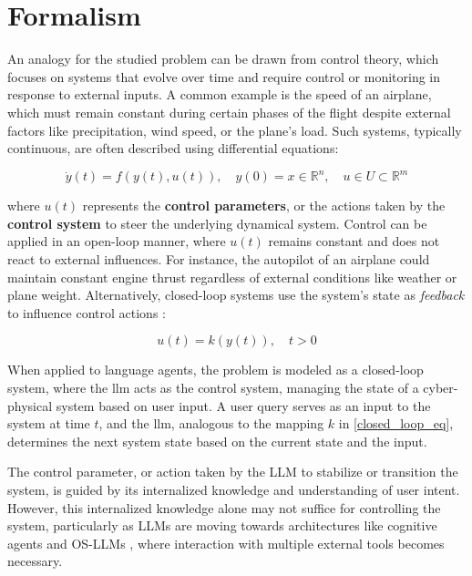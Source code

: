 \section{Formalism}

An analogy for the studied problem can be drawn from control theory, which focuses on systems that evolve over time and require control or monitoring in response to external inputs. A common example is the speed of an airplane, which must remain constant during certain phases of the flight despite external factors like precipitation, wind speed, or the plane's load. Such systems, typically continuous, are often described using differential equations:

\begin{equation}
    \dot{y}(t) = f(y(t), u(t)), \quad y(0) = x \in \mathbb{R}^n, \quad u \in U \subset \mathbb{R}^m
\end{equation}

where $u(t)$ represents the \textbf{control parameters}, or the actions taken by the \textbf{control system} to steer the underlying dynamical system. Control can be applied in an open-loop manner, where $u(t)$ remains constant and does not react to external influences. For instance, the autopilot of an airplane could maintain constant engine thrust regardless of external conditions like weather or plane weight. Alternatively, closed-loop systems use the system's state as \textit{feedback} to influence control actions \cite{zabczyk2020mathematical}:

\begin{equation}\label{closed_loop_eq}
    u(t) = k(y(t)), \quad t > 0
\end{equation}

When applied to language agents, the problem is modeled as a closed-loop system, where the \gls{llm} acts as the control system, managing the state of a cyber-physical system based on user input. A user query serves as an input to the system at time $t$, and the \gls{llm}, analogous to the mapping $k$ in \autoref{closed_loop_eq}, determines the next system state based on the current state and the input.

\pskip

The control parameter, or action taken by the LLM to stabilize or transition the system, is guided by its internalized knowledge and understanding of user intent. However, this internalized knowledge alone may not suffice for controlling the system, particularly as LLMs are moving towards architectures like cognitive agents \cite{sumers2024cognitivearchitectureslanguageagents} and OS-LLMs \cite{aiasos}, where interaction with multiple external tools becomes necessary.

